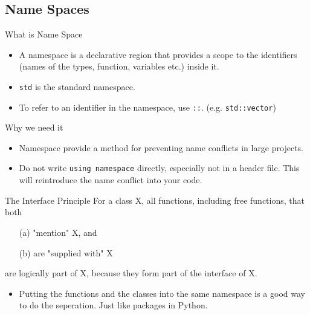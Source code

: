 \subsection{Name Spaces}
\begin{frame}{What is Name Space}
  \begin{itemize}
    \item A namespace is a declarative region that provides a scope to the identifiers (names of the types, function, variables etc.) inside it.
    \item \texttt{std} is the standard namespace.
    \item To refer to an identifier in the namespace, use \texttt{::}. (e.g. \texttt{std::vector})
  \end{itemize}
\end{frame}
\begin{frame}{Why we need it}
  \begin{itemize}
    \item Namespace provide a method for preventing name conflicts in large projects.
    \item Do not write \texttt{using namespace} directly, especially not in a header file. This will reintroduce the name conflict into your code. 
    
  \end{itemize}
\end{frame}
\begin{frame}{The Interface Principle}
  For a class X, all functions, including free functions, that both
    \begin{itemize}
    \item[(a)] "mention" X, and
    \item[(b)] are "supplied with" X
    \end{itemize}
    are logically part of X, because they form part of the interface of X. 
    \begin{itemize}
      \item Putting the functions and the classes into the same namespace is a good way to do the seperation. Just like packages in Python.
    \end{itemize}
\end{frame}
